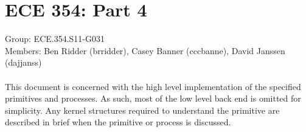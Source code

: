 \documentclass[oneside]{article}
\begin{document}
\lstset{language=C, 
        frame=single, 
        breaklines=true,
        basicstyle=\small\ttfamily,
        columns=fullflexible}
\section*{ECE 354: Part 4}
Group: ECE.354.S11-G031 \\
Members: Ben Ridder (brridder), Casey Banner (cccbanne), 
David Janssen (dajjanss) \\ \\
This document is concerned with the high level implementation of the specified
primitives and processes. As such, most of the low level back end is omitted
for simplicity. Any kernel structures required to understand the primitive are
described in brief when the primitive or process is discussed.
\end{document}
